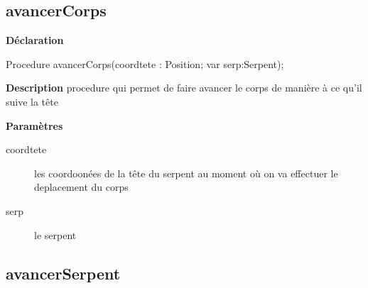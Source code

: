 \documentclass{report}
\newif\ifpdf
\begin{document}
\subsection*{avancerCorps}
\fi
\label{Deplacement-avancerCorps}
\begin{list}{}{
\setlength{\itemindent}{0cm}
\setlength{\listparindent}{0cm}
\setlength{\leftmargin}{\evensidemargin}
\addtolength{\leftmargin}{\tmplength}
\settowidth{\labelsep}{X}
\addtolength{\leftmargin}{\labelsep}
\setlength{\labelwidth}{\tmplength}
}
\item[\textbf{Déclaration}\hfill]
\ifpdf
\begin{flushleft}
\fi
\begin{ttfamily}
Procedure avancerCorps(coordtete : Position; var serp:Serpent);\end{ttfamily}

\ifpdf
\end{flushleft}
\fi

\par
\item[\textbf{Description}]
procedure qui permet de faire avancer le corps de manière à ce qu'il suive la tête  \par
\item[\textbf{Paramètres}]
\begin{description}
\item[coordtete] les coordoonées de la tête du serpent au moment où on va effectuer le deplacement du corps
\item[serp] le serpent
\end{description}


\end{list}
\ifpdf
\subsection*{\large{\textbf{avancerSerpent}}\normalsize\hspace{1ex}\hrulefill}
\else
\end{document}
